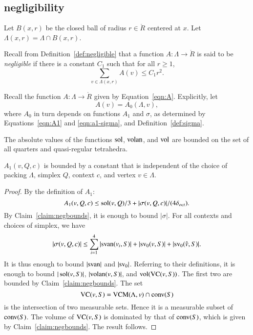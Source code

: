 \subsection{negligibility} \label{sec:negligible}

Let $B(x,r)$ be the closed ball of radius $r\in\ring{R}$ centered
at $x$.  Let $\Lambda(x,r)=\Lambda\cap B(x,r)$.

Recall from Definition~\ref{def:negligible} that a function
$A:\Lambda\to\ring{R}$ is said to be {\it negligible} if there is a
constant $C_1$ such that for all $r\ge1$,
   $$\sum_{v\in\Lambda(x,r) } A(v) \le C_1 r^2.$$
%


Recall the function $A: \Lambda\to\ring{R}$ given by
Equation~\ref{eqn:A}.  Explicitly, let
   $$A(v) = A_0(\Lambda,v),$$
where $A_0$ in turn depends on functions $A_1$ and $\sigma$, as
determined by Equations~\ref{eqn:A1} and \ref{eqn:a1-sigma}, and
Definition~\ref{def:sigma}.

\begin{claim}\label{claim:negbounds}
    The absolute values of the functions $\operatorname{sol}$, ${\operatorname{volan}}$, and ${\operatorname{vol}}$
are bounded on the set of all quarters and
    quasi-regular tetrahedra.
\end{claim}


\begin{lemma}\label{lemma:A1bound}  $A_1(v,Q,c)$ is bounded by a constant that is
independent of the choice of packing $\Lambda$, simplex
$Q$, context $c$, and vertex $v\in\Lambda$.
\end{lemma}

\begin{proof} By the definition of $A_1$:
    $$
    A_1(v,Q,c) \le \operatorname{sol}(v,Q)/3 + |\sigma(v,Q,c)|/(4\delta_{oct}).
    $$
By Claim~\ref{claim:negbounds}, it is enough to bound $|\sigma|$.
For all contexts and choices of simplex, we have
    $$|\sigma(v,Q,c)|\le \sum_{i=1}^4 |{\operatorname{svan}}(v_i,S)| +
        |{\operatorname{sv}}_0(v,S)| 
      + |{\operatorname{sv}}_0(\hat v,S)|.
    $$
It is thus enough to bound $|{\operatorname{svan}}|$ and $|{\operatorname{sv}}_0|$.  Referring
to their definitions, it is enough to bound $|\operatorname{sol}(v,S)|$,
$|{\operatorname{volan}}(v,S)|$, and ${\operatorname{vol}}({\operatorname{VC}}(v,S))$. The first two
are bounded by Claim~\ref{claim:negbounds}.  The set
    $${\operatorname{VC}}(v,S) = {\operatorname{VCM}}(\Lambda,v)\cap {\operatorname{conv}}(S)$$
is the intersection of two measurable sets.  Hence it is a
measurable subset of ${\operatorname{conv}}(S)$.  The volume of ${\operatorname{VC}}(v,S)$ is
dominated by that of ${\operatorname{conv}}(S)$, which is given by
Claim~\ref{claim:negbounds}.  The result follows.
\end{proof}

